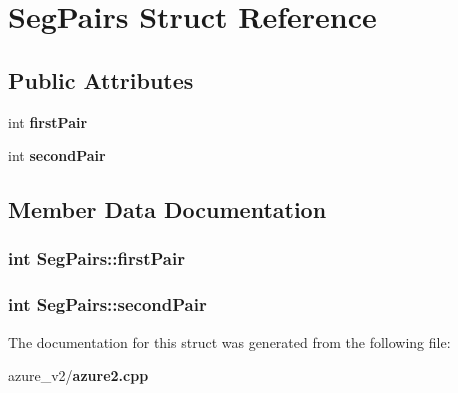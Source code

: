 \section{Seg\-Pairs Struct Reference}
\label{structSegPairs}
\subsection*{Public Attributes}
\begin{CompactItemize}
\item 
int \bf{first\-Pair}
\item 
int \bf{second\-Pair}
\end{CompactItemize}


\subsection{Member Data Documentation}
\subsubsection{\setlength{\rightskip}{0pt plus 5cm}int \bf{Seg\-Pairs::first\-Pair}}\label{structSegPairs_cdd42060f7dc80b6a64debc5ffaee95a}


\subsubsection{\setlength{\rightskip}{0pt plus 5cm}int \bf{Seg\-Pairs::second\-Pair}}\label{structSegPairs_a2012349c1a8ce69dfb92618637b49f1}




The documentation for this struct was generated from the following file:\begin{CompactItemize}
\item 
azure\_\-v2/\bf{azure2.cpp}\end{CompactItemize}
